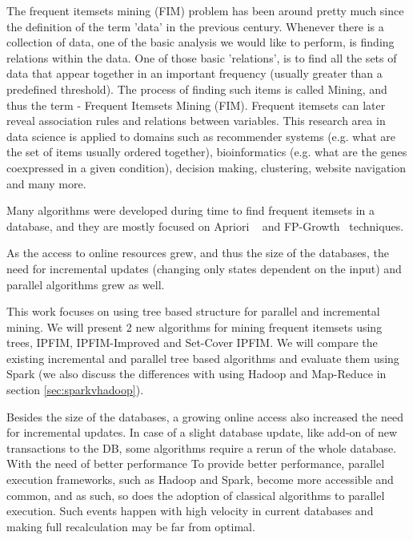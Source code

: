 The frequent itemsets mining (FIM) problem has been around pretty much since the definition of the term 'data' in the previous century. Whenever there is a collection of data, one of the basic analysis we would like to perform, is finding relations within the data. One of those basic 'relations', is to find all the sets of data that appear together in an important frequency (usually greater than a predefined threshold).  The process of finding such items is called Mining, and thus the term - Frequent Itemsets Mining (FIM). Frequent itemsets can later reveal association rules and relations between variables. This research area in data science is applied to domains such as recommender systems (e.g. what are the set of items usually ordered together), bioinformatics (e.g. what are the genes coexpressed in a given condition), decision making, clustering, website navigation and many more.

Many algorithms were developed during time to find frequent itemsets in a database, and they are mostly focused on Apriori ~\cite{agrawal1994fast} and FP-Growth~\cite{kohefficient} techniques.  

As the access to online resources grew, and thus the size of the databases, the need for incremental updates (changing only states dependent on the input) and parallel algorithms grew as well.

This work focuses on using tree based structure for parallel and incremental mining. 
We will present 2 new algorithms for mining frequent itemsets using trees, IPFIM, IPFIM-Improved and Set-Cover IPFIM. We will compare the existing incremental and parallel tree based algorithms and evaluate them using Spark (we also discuss the differences with using Hadoop and Map-Reduce in section \autoref{sec:sparkvhadoop}).

\iffalse
Besides the size of the databases, a growing online access also increased the need for incremental updates. 
In case of a slight database update, like add-on of new transactions to the DB, some algorithms require a rerun of the whole database.
With the need of better performance To provide better performance, parallel execution frameworks, such as Hadoop and Spark, become more accessible and common,  and as such, so does the adoption of classical algorithms to parallel execution.  
Such events happen with high velocity in current databases and making full recalculation may be far from optimal. 

